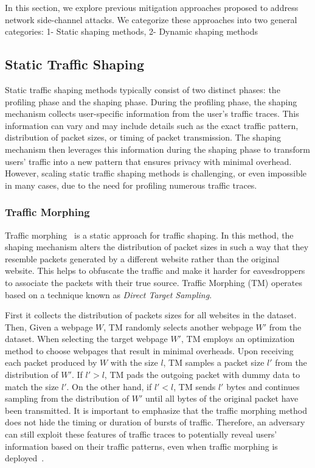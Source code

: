 In this section, we explore previous mitigation approaches proposed to address network side-channel attacks. 
We categorize these approaches into two general categories: 1- Static shaping methods, 2- Dynamic shaping methods 




\subsection{Static Traffic Shaping}\label{subsec:static-traffic-shaping}
Static traffic shaping methods typically consist of two distinct phases: the profiling phase and the shaping phase.
During the profiling phase, the shaping mechanism collects user-specific information from the user's traffic traces.
This information can vary and may include details such as the exact traffic pattern, distribution of packet sizes, or timing of packet transmission.
The shaping mechanism then leverages this information during the shaping phase to transform users' traffic into a new pattern that ensures privacy with minimal overhead.
However, scaling static traffic shaping methods is challenging, or even impossible in many cases, due to the need for profiling numerous traffic traces.
\subsubsection{Traffic Morphing}\label{subsubsec:traffic-morphing}
Traffic morphing~\cite{wright2009traffic} is a static approach for traffic shaping. 
In this method, the shaping mechanism alters the distribution of packet sizes in such a way that they resemble packets generated by a different website rather than the original website.
This helps to obfuscate the traffic and make it harder for eavesdroppers to associate the packets with their true source.
Traffic Morphing (TM) operates based on a technique known as \textit{Direct Target Sampling}.

First it collects the distribution of packets sizes for all websites in the dataset.
Then, Given a webpage $W$, TM randomly selects another webpage $W'$ from the dataset.
When selecting the target webpage $W'$, TM employs an optimization method to choose webpages that result in minimal overheads. 
Upon receiving each packet produced by $W$ with the size $l$, TM samples a packet size $l'$ from the distribution of $W'$. 
If $l' > l$, TM pads the outgoing packet with dummy data to match the size $l'$. 
On the other hand, if $l' < l$, TM sends $l'$ bytes and continues sampling from the distribution of $W'$ until all bytes of the original packet have been transmitted.
It is important to emphasize that the traffic morphing method does not hide the timing or duration of bursts of traffic.
Therefore, an adversary can still exploit these features of traffic traces to potentially reveal users' information based on their traffic patterns, even when traffic morphing is deployed~\cite{dyer2012peek}.


